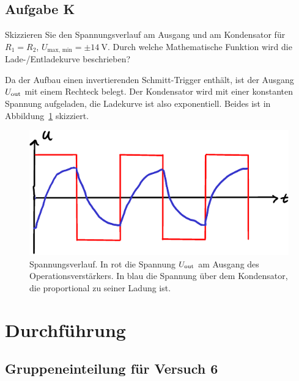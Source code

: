 \FloatBarrier
\subsection{Aufgabe K}

\begin{problem}
	Skizzieren Sie den Spannungsverlauf am Ausgang und am Kondensator für $R_1
	= R_2$, $U_\text{max, min} = \pm \SI{14}\volt$. Durch welche Mathematische
	Funktion wird die Lade-/Entladekurve beschrieben?
\end{problem}

Da der Aufbau einen invertierenden Schmitt-Trigger enthält, ist der Ausgang
$U_\text{out}$ mit einem Rechteck belegt. Der Kondensator wird mit einer konstanten
Spannung aufgeladen, die Ladekurve ist also exponentiell. Beides ist in
Abbildung~\ref{fig:K} skizziert.

\begin{figure}[htbp]
	\centering
	\includegraphics{K.pdf}
	\caption{%
		Spannungsverlauf. In rot die Spannung $U_\text{out}$ am Ausgang des
		Operationsverstärkers. In blau die Spannung über dem Kondensator, die
		proportional zu seiner Ladung ist.
	}
	\label{fig:K}
\end{figure}


\FloatBarrier
\section{Durchführung}

\FloatBarrier
\subsection{Gruppeneinteilung für Versuch 6}

